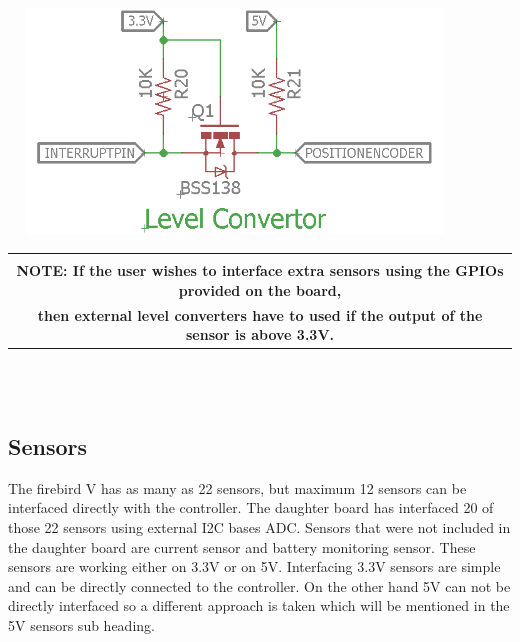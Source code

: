 \documentclass[a4paper,10pt,oneside]{article}
\begin{document}
{	\hspace{3.5cm}
	\includegraphics[width=12cm, height=6cm]{Level_Converter}\\
	\begin{tabular}{|c|}
		\hline
		\\
		\textbf{NOTE: If the user wishes to interface extra sensors using the GPIOs provided on the board,} \\ \textbf{then external level converters have to used if the output of the sensor is above 3.3V.}
		\\
		\hline
	\end{tabular}\\\\
	\subsection{\huge \textbf{Sensors}}{The firebird V has as many as 22 sensors, but maximum 12 sensors can be interfaced directly with the controller. The daughter board has interfaced 20 of those 22 sensors using external I2C bases ADC. Sensors that were not included in the daughter board are current sensor and battery monitoring sensor. These sensors are working either on 3.3V or on 5V. Interfacing 3.3V sensors are simple and can be directly connected to the controller. On the other hand 5V can not be directly interfaced so a different approach is taken which will be mentioned in the 5V sensors sub heading.}
}
\end{document}
